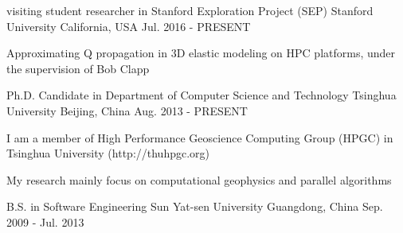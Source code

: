 

\begin{cventries}

  \cventry
    {visiting student researcher in Stanford Exploration Project (SEP)} %
    {Stanford University} %
    {California, USA} %
    {Jul. 2016 - PRESENT} %
    {
      \begin{cvitems} %
        \item {Approximating Q propagation in 3D elastic modeling on HPC platforms, under the supervision of Bob Clapp}
      \end{cvitems}
    }

  \cventry
    {Ph.D. Candidate in Department of Computer Science and Technology} %
    {Tsinghua University} %
    {Beijing, China} %
    {Aug. 2013 - PRESENT} %
    {
      \begin{cvitems} %
        \item {I am a member of High Performance Geoscience Computing Group (HPGC) in Tsinghua University (http://thuhpgc.org)}
        \item {My research mainly focus on computational geophysics and parallel algorithms}
      \end{cvitems}
    }

  \cventry
    {B.S. in Software Engineering} %
    {Sun Yat-sen University} %
    {Guangdong, China} %
    {Sep. 2009 - Jul. 2013} %
    {}
\end{cventries}
